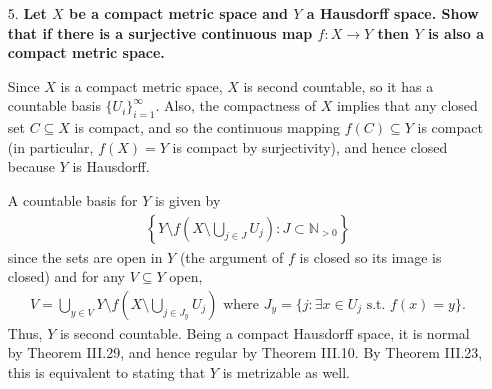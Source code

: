 \documentclass[a4paper,12pt]{article}
\begin{document}
\begin{enumerate}
    \item[5.]
        \boldmath\textbf{Let $X$ be a compact metric space and $Y$ a Hausdorff space. Show that if there is a surjective continuous map $f : X \to Y$ then $Y$ is also a compact metric space.
        }\unboldmath \par
        Since $X$ is a compact metric space, $X$ is second countable, so it has a countable basis $\{ U_i \}_{i = 1}^\infty$. Also, the compactness of $X$ implies that any closed set $C \subseteq X$ is compact, and so the continuous mapping $f(C) \subseteq Y$ is compact (in particular, $f(X) = Y$ is compact by surjectivity), and hence closed because $Y$ is Hausdorff. \par
        A countable basis for $Y$ is given by
        \begin{align*}
            \left\{ Y \setminus f \left( X \setminus \bigcup_{j \in J} U_j \right) : J \subset \mathbb{N}_{> 0} \right\}
        \end{align*}
        since the sets are open in $Y$ (the argument of $f$ is closed so its image is closed) and for any $V \subseteq Y$ open,
        \begin{align*}
            V = \bigcup_{y \in V} Y \setminus f \left( X \setminus \bigcup_{j \in J_y} U_j \right) \text{ where } J_y = \{ j : \exists x \in U_j \text{ s.t. } f(x) = y \}.
        \end{align*}
        Thus, $Y$ is second countable. Being a compact Hausdorff space, it is normal by Theorem III.29, and hence regular by Theorem III.10. By Theorem III.23, this is equivalent to stating that $Y$ is metrizable as well.


\end{enumerate}
\end{document}
